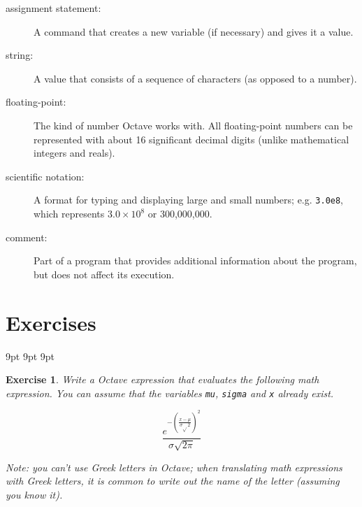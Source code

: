 \documentclass{book}
\begin{document}
\begin{description}
\item[assignment statement:] A command that creates a new variable
(if necessary) and gives it a value.

\item[string:] A value that consists of a sequence of characters (as
opposed to a number). 

\item[floating-point:] The kind of number Octave works with. All
floating-point numbers can be represented with about 16 significant
decimal digits (unlike mathematical integers and reals).

\item[scientific notation:] A format for typing and displaying large
and small numbers; e.g. {\tt 3.0e8}, which represents $3.0 \times 10^8$
or 300,000,000. 

\item[comment:] Part of a program that provides additional information
about the program, but does not affect its execution. 

\end{description}


\section{Exercises}

   {9pt}%
   {9pt}%
   {\itshape}%
   {}%
   {\bfseries}%
   {}%
   {9pt}%
   {}%


\theoremstyle{myex}
\newtheorem{ex}{Exercise}[chapter]

\begin{ex}
Write a Octave expression that evaluates the
following math expression. You can assume that the variables
{\tt mu}, {\tt sigma} and {\tt x} already exist.

\begin{equation}
\frac{e^{- \left( \frac{x-\mu}{\sigma \sqrt{}2} \right) ^2}}
{\sigma \sqrt{2 \pi}}
\end{equation}

Note: you can't use Greek letters in Octave; when translating
math expressions with Greek letters, it is common to write out
the name of the letter (assuming you know it).
\end{ex}
 
\end{document}
